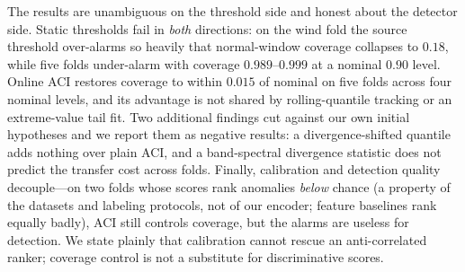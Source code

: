 The results are unambiguous on the threshold side and honest about the detector side. Static thresholds fail in \emph{both} directions: on the wind fold the source threshold over-alarms so heavily that normal-window coverage collapses to $0.18$, while five folds under-alarm with coverage $0.989$--$0.999$ at a nominal $0.90$ level. Online ACI restores coverage to within $0.015$ of nominal on five folds across four nominal levels, and its advantage is not shared by rolling-quantile tracking or an extreme-value tail fit. Two additional findings cut against our own initial hypotheses and we report them as negative results: a divergence-shifted quantile adds nothing over plain ACI, and a band-spectral divergence statistic does not predict the transfer cost across folds. Finally, calibration and detection quality decouple---on two folds whose scores rank anomalies \emph{below} chance (a property of the datasets and labeling protocols, not of our encoder; feature baselines rank equally badly), ACI still controls coverage, but the alarms are useless for detection. We state plainly that calibration cannot rescue an anti-correlated ranker; coverage control is not a substitute for discriminative scores.

